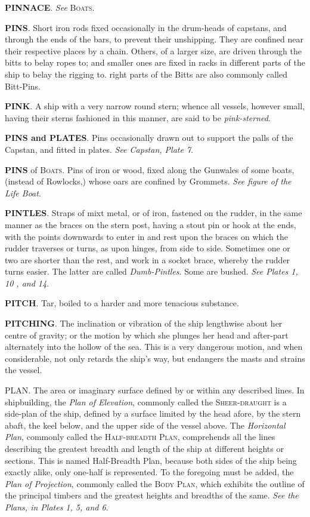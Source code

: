 \textbf{PINNACE}. \textit{See} \textsc{Boats}. 

\textbf{PINS}. Short iron rods fixed occasionally in the drum-heads of capstans, and through the ends of the bars, to prevent their unshipping. They are confined near their respective places by a chain. Others, of a larger size, are driven through the bitts to belay ropes to; and smaller ones are fixed in racks in different parts of the ship to belay the rigging to. right parts of the Bitts are also commonly called Bitt-Pins. 

\textbf{PINK}. A ship with a very narrow round stern; whence all vessels, however small, having their sterns fashioned in this manner, are said to be \textit{pink-sterned}. 

\textbf{PINS and PLATES}. Pins occasionally drawn out to support the palls of the Capstan, and fitted in plates. \textit{See Capstan, Plate 7}.

\textbf{PINS} of \textsc{Boats}. Pins of iron or wood, fixed along the Gunwales of some boats, (instead of Rowlocks,) whose oars are confined by Grommets. \textit{See figure of the Life Boat}. 

\textbf{PINTLES}. Straps of mixt metal, or of iron, fastened on the rudder, in the same manner as the braces on the stern post, having a stout pin or hook at the ends, with the points downwards to enter in and rest upon the braces on which the rudder traverses or turns, as upon hinges, from side to side. Sometimes one or two are shorter than the rest, and work in a socket brace, whereby the rudder turns easier. The latter are called \textit{Dumb-Pintles}. Some are bushed. \textit{See Plates 1, 10 , and 14}. 

\textbf{PITCH}. Tar, boiled to a harder and more tenacious substance. 

\textbf{PITCHING}. The inclination or vibration of the ship lengthwise about her centre of gravity; or the motion by which she plunges her head and after-part alternately into the hollow of the sea. This is a very dangerous motion, and when considerable, not only retards the ship's way, but endangers the masts and strains the vessel. 

PLAN. The area or imaginary surface defined by or within any described lines. In shipbuilding, the \textit{Plan of Elevation}, commonly called the \textsc{Sheer-draught} is a side-plan of the ship, defined by a surface limited by the head afore, by the stern abaft, the keel below, and the upper side of the vessel above. The \textit{Horizontal Plan}, commonly called the \textsc{Half-breadth Plan}, comprehends all the lines describing the greatest breadth and length of the ship at different heights or sections. This is named Half-Breadth Plan, because both sides of the ship being exactly alike, only one-half is represented. To the foregoing must be added, the \textit{Plan of Projection}, commonly called the \textsc{Body Plan}, which exhibits the outline of the principal timbers and the greatest heights and breadths of the same. \textit{See the Plans, in Plates 1, 5, and 6}. 

